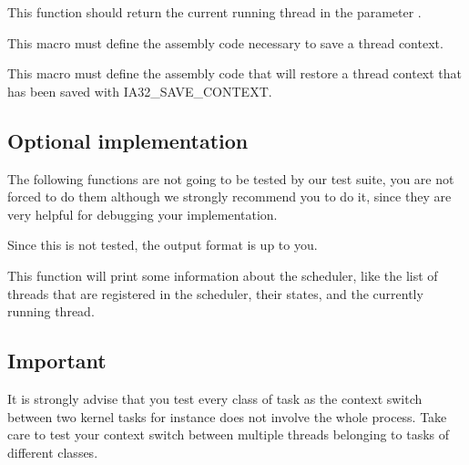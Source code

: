 {
  This function should return the current running thread in the parameter
  .
}

{
  This macro must define the assembly code necessary to save a thread context.
}

{
  This macro must define the assembly code that will restore a thread context
  that has been saved with IA32\_SAVE\_CONTEXT.
}

\subsection*{Optional implementation}

The following functions are not going to be tested by our test suite, you are
not forced to do them although we strongly recommend you to do it, since they
are very helpful for debugging your implementation.

\-

Since this is not tested, the output format is up to you.

{
  This function will print some information about the scheduler, like the list
  of threads that are registered in the scheduler, their states, and the
  currently running thread.
}

\subsection*{Important}

It is strongly advise that you test every class of task as the context
switch between two kernel tasks for instance does not involve the whole
process. Take care to test your context switch between multiple threads
belonging to tasks of different classes.
